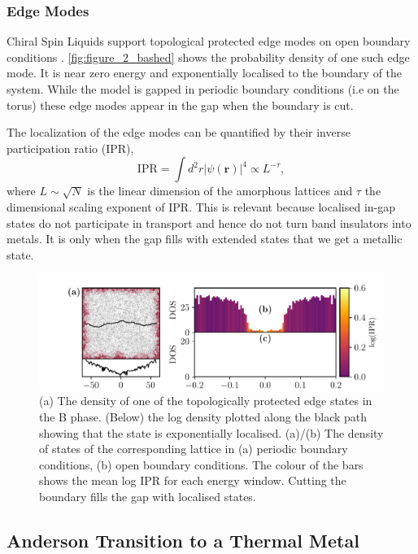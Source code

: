 \hypertarget{edge-modes}{%
\subsubsection{Edge Modes}\label{edge-modes}}

Chiral Spin Liquids support topological protected edge modes on open boundary conditions \autocite{qi_general_2006}. \cref{fig:figure_2_bashed} shows the probability density of one such edge mode. It is near zero energy and exponentially localised to the boundary of the system. While the model is gapped in periodic boundary conditions (i.e on the torus) these edge modes appear in the gap when the boundary is cut.

The localization of the edge modes can be quantified by their inverse participation ratio (IPR), \[\mathrm{IPR} = \int d^2r|\psi(\mathbf{r})|^4  \propto L^{-\tau},\] where \(L\sim\sqrt{N}\) is the linear dimension of the amorphous lattices and \(\tau\) the dimensional scaling exponent of IPR. This is relevant because localised in-gap states do not participate in transport and hence do not turn band insulators into metals. It is only when the gap fills with extended states that we get a metallic state.

\begin{figure}
\hypertarget{fig:edge_modes}{%
\centering
\includegraphics[width=1\textwidth,height=\textheight]{figure_code/amk_chapter/results/edge_modes/edge_modes.pdf}
\caption{(a) The density of one of the topologically protected edge states in the B phase. (Below) the log density plotted along the black path showing that the state is exponentially localised. (a)/(b) The density of states of the corresponding lattice in (a) periodic boundary conditions, (b) open boundary conditions. The colour of the bars shows the mean log IPR for each energy window. Cutting the boundary fills the gap with localised states.}\label{fig:edge_modes}
}
\end{figure}

\hypertarget{anderson-transition-to-a-thermal-metal}{%
\subsection{Anderson Transition to a Thermal Metal}\label{anderson-transition-to-a-thermal-metal}}

